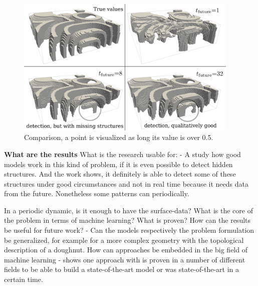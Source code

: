 \begin{figure}[!htb]
    \center
    \includegraphics[width=0.95\textwidth]{figures/CLSTM_p26_d32_t_1_8_32.png}
	\caption{Comparison, a point is visualized as long its value is over 0.5.}
	\label{fig:clstm_3d_p26}
\end{figure}

\textbf{What are the results}
What is the research usable for:
    - A study how good models work in this kind of problem, if it is even possible to detect hidden structures. And the work shows, it definitely is able to detect some of these structures under good circumstances and not in real time because it needs data from the future. Nonetheless some patterns can periodically. 

In a periodic dynamic, is it enough to have the surface-data? 
What is the core of the problem in terms of machine learning?
What is proven?
How can the results be useful for future work?
    - Can the models respectively the problem formulation be generalized, for example for a more complex geometry with the topological description of a doughnut.
How can approaches be embedded in the big field of machine learning 
    - shows one approach with is proven in a number of different fields to be able to build a state-of-the-art model or was state-of-the-art in a certain time.
    


